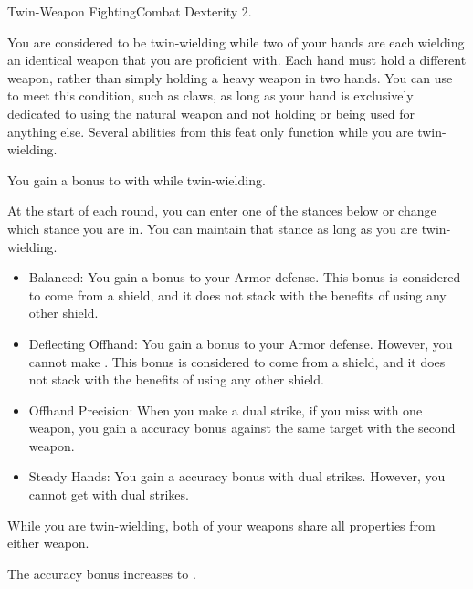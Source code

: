   \begin{feat}{Twin-Weapon Fighting}{Combat}
    \featpre Dexterity 2.

     You are considered to be twin-wielding while two of your hands are each wielding an identical weapon that you are proficient with.
    Each hand must hold a different weapon, rather than simply holding a heavy weapon in two hands.
    You can use  to meet this condition, such as claws, as long as your hand is exclusively dedicated to using the natural weapon and not holding or being used for anything else.
    Several abilities from this feat only function while you are twin-wielding.

     You gain a  bonus to  with  while twin-wielding.

     At the start of each round, you can enter one of the stances below or change which stance you are in.
    You can maintain that stance as long as you are twin-wielding.
    \begin{itemize}
      \item Balanced: You gain a  bonus to your Armor defense.
        This bonus is considered to come from a shield, and it does not stack with the benefits of using any other shield.
      \item Deflecting Offhand: You gain a  bonus to your Armor defense.
        However, you cannot make .
        This bonus is considered to come from a shield, and it does not stack with the benefits of using any other shield.
      \item Offhand Precision: When you make a dual strike, if you miss with one weapon, you gain a  accuracy bonus against the same target with the second weapon.
      \item Steady Hands: You gain a  accuracy bonus with dual strikes.
        However, you cannot get  with dual strikes.
    \end{itemize}

     While you are twin-wielding, both of your weapons share all \magical properties from either weapon.

     The accuracy bonus increases to .
  \end{feat}

